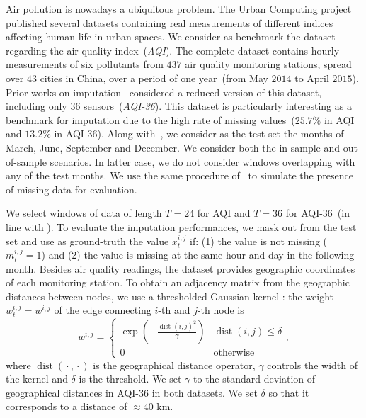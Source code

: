 \documentclass{article} \usepackage{iclr2022_conference,times}
\begin{document}
Air pollution is nowadays a ubiquitous problem. The Urban Computing project~\citep{zheng2014urban, zheng2015forecasting} published several datasets containing real measurements of different indices affecting human life in urban spaces. We consider as benchmark the dataset regarding the air quality index~(\emph{AQI}). The complete dataset contains hourly measurements of six pollutants from $437$ air quality monitoring stations, spread over $43$ cities in China, over a period of one year~(from May $2014$ to April $2015$). Prior works on imputation~\citep{yi2016stmvl, cao2018brits} considered a reduced version of this dataset, including only $36$ sensors~(\emph{AQI-36}). This dataset is particularly interesting as a benchmark for imputation due to the high rate of missing values~($25.7\%$ in AQI and $13.2\%$ in AQI-36). Along with~\citet{yi2016stmvl}, we consider as the test set the months of March, June, September and December. We consider both the in-sample and out-of-sample scenarios. In latter case, we do not consider windows overlapping with any of the test months. We use the same procedure of~\citet{yi2016stmvl} to simulate the presence of missing data for evaluation.

We select windows of data of length $T=24$ for AQI and $T=36$ for AQI-36~(in line with \citet{cao2018brits}). To evaluate the imputation performances, we mask out from the test set and use as ground-truth the value $x_t^{i,j}$ if: (1) the value is not missing ($m_t^{i,j}=1$) and (2) the value is missing at the same hour and day in the following month.
Besides air quality readings, the dataset provides geographic coordinates of each monitoring station. To obtain an adjacency matrix from the geographic distances between nodes, we use a thresholded Gaussian kernel \citep{shuman2013emerging}: the weight $w_t^{i,j}=w^{i,j}$ of the edge connecting $i$-th and $j$-th node is
\begin{equation}\label{eq:kernel}
w^{i,j} = \left\{\begin{array}{cl}
     \exp \left(-\frac{\operatorname{dist}\left(i, j\right)^{2}}{\gamma}\right) & \operatorname{dist}\left(i, j\right) \leq \delta  \\
     0 & \text{otherwise} 
\end{array}\right. ,
\end{equation}
where $\operatorname{dist}\left({}\cdot{}, {}\cdot{}\right)$ is the geographical distance operator, $\gamma$ controls the width of the kernel and $\delta$ is the threshold. We set $\gamma$ to the standard deviation of geographical distances in AQI-36 in both datasets. We set $\delta$ so that it corresponds to a distance of ${}\approx 40$ km.
\end{document}
